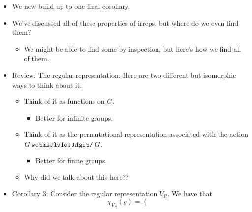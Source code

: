\documentclass[../notes.tex]{subfiles}
\begin{document}
\begin{itemize}
\begin{proof}
        as desired.\par
        ($2\Rightarrow 1$): Complete reducibility implies that $V\cong V_1^{n_1}\oplus\cdots\oplus V_k^{n_k}$, where the $V_i$'s are irreps. This combined with the hypothesis implies that
        \begin{equation*}
            1 = \inp{\chi_V,\chi_V}
            = \inp{\sum_{i=1}^kn_i\chi_{V_i},\sum_{i=1}^kn_i\chi_{V_i}}
            = \sum_{i=1}^kn_i^2
        \end{equation*}
        But if $\sum n_i^2=1$ where each $n_i\in\Z^+$, then $n_i=1$ for some $i$ and $n_j=0$ for $j\neq i$, from which it follows that $V\cong V_i$.\par
        We can interconvert between 2 and 3 using the definition of the inner product and the property of complex numbers that $zz^*=|z|^2$.
    \end{proof}
    \item We now build up to one final corollary.
    \item We've discussed all of these properties of irreps, but where do we even find them?
    \begin{itemize}
        \item We might be able to find some by inspection, but here's how we find all of them.
    \end{itemize}
    \item Review: The regular representation. Here are two different but isomorphic ways to think about it.
    \begin{itemize}
        \item Think of it as functions on $G$.
        \begin{itemize}
            \item Better for infinite groups.
        \end{itemize}
        \item Think of it as the permutational representation associated with the action $G\acts G$.
        \begin{itemize}
            \item Better for finite groups.
        \end{itemize}
        \item Why did we talk about this here??
    \end{itemize}
    \item Corollary 3: Consider the regular representation $V_R$. We have that
    \begin{equation*}
        \chi_{V_R}(g) =
        \begin{cases}

\end{cases}
\end{equation*}
\end{itemize}
\end{document}
